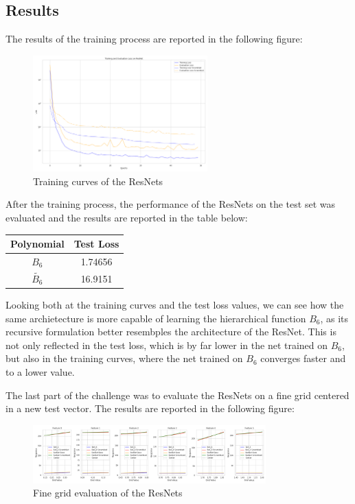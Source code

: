 \documentclass[a4paper, 10pt]{article}
\begin{document}
\subsection{Results}
The results of the training process are reported in the following figure:
\begin{figure}[h]
    \centering
    \includegraphics[width=0.6\textwidth]{images/training_curves_resnet_exB.png}
    \caption{Training curves of the ResNets}
    \label{fig:training_curves_resnet_exB}
\end{figure}

After the training process, the performance of the ResNets on the test set was evaluated and the results are reported in the table below:
\begin{center}
    \begin{tabular}{c|c}
        \textbf{Polynomial} & \textbf{Test Loss} \\
        \hline
        $B_6$ & 1.74656 \\
        $\tilde{B_6}$ & 16.9151 \\
    \end{tabular}
    \label{tab:resnets_performance}
\end{center}

Looking both at the training curves and the test loss values, we can see how the same archietecture is more capable of learning the hierarchical function $B_6$,
as its recursive formulation better resembples the architecture of the ResNet. This is not only reflected in the test loss, which is by far lower in the net trained
on $B_6$, but also in the training curves, where the net trained on $B_6$ converges faster and to a lower value.

The last part of the challenge was to evaluate the ResNets on a fine grid centered in a new test vector. The results are reported in the following figure:

\begin{figure}[h]
    \centering
    \includegraphics[width=0.8\textwidth]{images/predictions_exB.png}
    \caption{Fine grid evaluation of the ResNets}
    \label{fig:fine_grid_evaluation_exB}
\end{figure}
\end{document}
